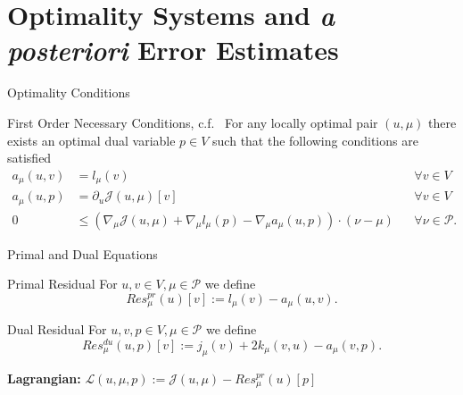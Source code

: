 \section{Optimality Systems and \textit{a posteriori} Error Estimates}

\begin{frame}{Optimality Conditions}
    \begin{block}{First Order Necessary Conditions, c.f.~\cite{Keil2021}}
        For any locally optimal pair $(u, \mu)$ there exists an optimal dual variable $p \in V$ such that the following conditions are satisfied
        \begin{align*}
            a_\mu(u, v) &= l_\mu(v) &&\forall v \in V \\
            a_\mu(u, p) &= \partial_u \mathcal{J}(u, \mu)[v] &&\forall v \in V \\
            0 &\leq (\nabla_\mu \mathcal{J}(u, \mu) + \nabla_\mu l_\mu(p) - \nabla_\mu a_\mu(u, p)) \cdot (\nu - \mu) &&\forall \nu \in \mathcal{P}.
        \end{align*}
    \end{block}
\end{frame}

\begin{frame}{Primal and Dual Equations}
    \begin{block}{Primal Residual}
        For $u, v \in V, \mu \in \mathcal{P}$ we define
        \begin{equation*}
            Res_\mu^{pr}(u)[v] := l_\mu(v) - a_\mu(u, v).
        \end{equation*}
    \end{block}
    \begin{block}{Dual Residual}
        For $u, v, p \in V, \mu \in \mathcal{P}$ we define
        \begin{equation*}
            Res_\mu^{du}(u, p)[v] := j_\mu(v) + 2 k_\mu(v, u) - a_\mu(v, p).
        \end{equation*}
    \end{block}
    \textbf{Lagrangian:} $\mathcal{L}(u, \mu, p) := \mathcal{J}(u, \mu) - Res_\mu^{pr}(u)[p]$
\end{frame}

